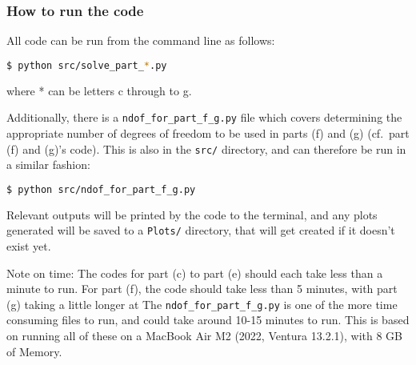 \documentclass[12pt]{report} %
\begin{document}
\subsubsection*{How to run the code}
All code can be run from the command line as follows:

\vspace*{1\baselineskip}
\begin{lstlisting}[language=bash, caption={Running the code for each part}]
    $ python src/solve_part_*.py
\end{lstlisting}

where * can be letters c through to g.  

Additionally, there is a \texttt{ndof\_for\_part\_f\_g.py} file which covers determining the appropriate number of degrees of freedom to be used in parts (f) and (g) (cf.\ part (f) and (g)'s code). This is also in the \texttt{src/} directory, and can therefore be run in a similar fashion:  

\vspace*{1\baselineskip}
\begin{lstlisting}[language=bash, caption={Running the number of DoF fitting code}]
    $ python src/ndof_for_part_f_g.py
\end{lstlisting}

Relevant outputs will be printed by the code to the terminal, and any plots generated will be saved to a \texttt{Plots/} directory, that will get created if it doesn't exist yet.


Note on time: The codes for part (c) to part (e) should each take less than a minute to run. For part (f), the code should take less than 5 minutes, with part (g) taking a little longer at The \texttt{ndof\_for\_part\_f\_g.py} is one of the more time consuming files to run, and could take around 10-15 minutes to run. This is based on running all of these on a MacBook Air M2 (2022, Ventura 13.2.1), with 8 GB of Memory.
\end{document}
